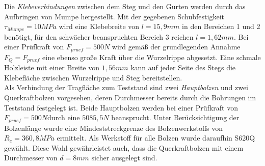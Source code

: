 \noindent Die \textit{Klebeverbindungen} zwischen dem Steg und den Gurten werden durch das Aufbringen von Mumpe hergestellt. Mit der gegebenen Schubfestigkeit $ \tau_{Mumpe}=10MPa $ wird eine Klebebreite von $ l=15,9mm $ in den Bereichen 1 und 2 benötigt, für den schwächer beanspruchten Bereich 3 reichen $ l=1,62mm $. Bei einer Prüfkraft von $ F_{pruef}=500N $ wird gemäß der grundlegenden Annahme $ F_{Q}=F_{pruef} $ eine ebenso große Kraft über die Wurzelrippe abgesetzt. Eine schmale Holzleiste mit einer Breite von $ 1,56mm $ kann auf jeder Seite des Stegs die Klebefläche zwischen Wurzelrippe und Steg bereitstellen.\\

\noindent Als Verbindung der Tragfläche zum Teststand sind zwei \textit{Hauptbolzen} und zwei Querkraftbolzen vorgesehen, deren Durchmesser bereits durch die Bohrungen im Teststand festgelegt ist. Beide Hauptbolzen werden bei einer Prüfkraft von $ F_{pruef}=500N $durch eine $ 5085,5N $ beansprucht. Unter Berücksichtigung der Bolzenlänge wurde eine Mindeststreckgrenze des Bolzenwerkstoffs von $ R_{e}=360,8MPa $ ermittelt. Als Werkstoff für alle Bolzen wurde daraufhin S620Q gewählt. Diese Wahl gewährleistet auch, dass die Querkraftbolzen mit einem Durchmesser von $ d=8mm $ sicher ausgelegt sind.\\

